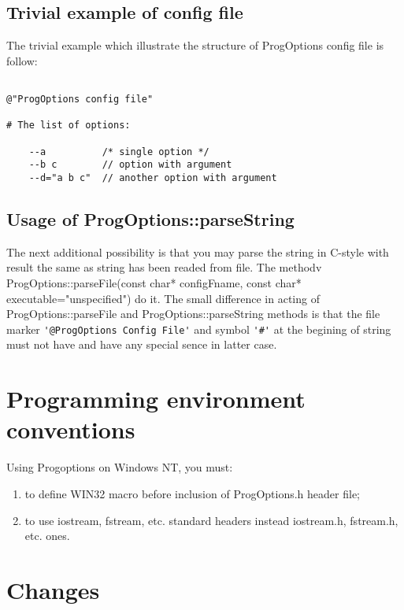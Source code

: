\documentclass[10pt]{article}
\begin{document}
\subsection {Trivial example of config file}

The trivial example which illustrate the structure of ProgOptions config file is follow:


\begin{verbatim}

@"ProgOptions config file"

# The list of options: 

    --a          /* single option */
    --b c        // option with argument 
    --d="a b c"  // another option with argument

\end{verbatim}


\subsection { Usage of ProgOptions::parseString }

  The next additional possibility is that you may parse the string in C-style
with result the same as string has been readed from file.
The methodv ProgOptions::parseFile(const char* configFname, const char* executable="unspecified") do it. 
The small difference in acting of ProgOptions::parseFile and ProgOptions::parseString methods
is that the file marker \verb|'@ProgOptions Config File'| and symbol \verb|'#'| at the begining of string
must not have and have any special sence in latter case.


\section{ Programming environment conventions }
\label{environment}

Using Progoptions on Windows NT, you must:
\begin{enumerate}
  \item to define WIN32 macro before inclusion of ProgOptions.h header file;
  \item to use iostream, fstream, etc. standard headers instead iostream.h, fstream.h, etc. ones.
\end{enumerate}


\section{Changes}
\end{document}
